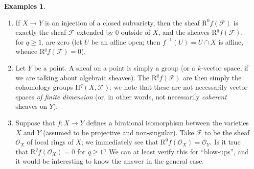 \documentclass[10pt]{article}
\theoremstyle{plain}
\theoremstyle{definition}
\newtheorem*{examples}{Examples}
\newcommand{\sh}{\mathscr}
\newcommand{\HH}{\mathrm{H}}
\newcommand{\RR}{\mathrm{R}}
\renewcommand{\geq}{\geqslant}
\begin{document}
\begin{examples}
  \begin{enumerate}
    \item If $X\to Y$ is an injection of a closed subvariety, then the sheaf $\RR^0f(\sh{F})$ is exactly the sheaf $\sh{F}$ extended by $0$ outside of $X$, and the sheaves $\RR^qf(\sh{F})$, for $q\geq1$, are zero (let $U$ be an affine open; then $f^{-1}(U)=U\cap X$ is affine, whence $\RR^qf(\sh{F})=0$).
    \item Let $Y$ be a point.
      A sheaf on a point is simply a group (or a $k$-vector space, if we are talking about algebraic sheaves).
      The $\RR^qf(\sh{F})$ are then simply the cohomology groups $\HH^q(X,\sh{F})$;
      we note that these are not necessarily vector spaces \emph{of finite dimension} (or, in other words, not necessarily \emph{coherent} sheaves on $Y$).
    \item Suppose that $f\colon X\to Y$ defines a birational isomorphism between the varieties $X$ and $Y$ (assumed to be projective and non-singular).
      Take $\sh{F}$ to be the sheaf $\sh{O}_X$ of local rings of $X$;
      we immediately see that $\RR^0f(\sh{O}_X)=\sh{O}_Y$.
      Is it true that $\RR^qf(\sh{O}_X)=0$ for $q\geq1$?
      We can at least verify this for ``blow-ups'', and it would be interesting to know the answer in the general case.
  \end{enumerate}
\end{examples}



\nocite{*}


\end{document}
